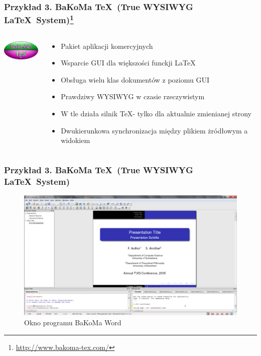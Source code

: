 \documentclass[t]{beamer}
\begin{document}
\begin{frame}[t]
	\frametitle{Przykład 3. BaKoMa \TeX\ (True WYSIWYG \LaTeX\ System)\footnote{\url{http://www.bakoma-tex.com/}}}
		\begin{columns}[T]
			\begin{column}{.15\textwidth}
				\includegraphics[width=2cm]{bakoma_logo.png}
			\end{column}
			\begin{column}{.85\textwidth}
				\begin{itemize}
					\item Pakiet aplikacji komercyjnych 
					\item Wsparcie GUI dla większości funckji \LaTeX\ 
					\item Obsługa wielu klas dokumentów z poziomu GUI
					\item Prawdziwy WYSIWYG w czasie rzeczywistym
					\item W tle działa silnik \TeX - tylko dla aktualnie zmienianej strony
					\item Dwukierunkowa synchronizacja między plikiem żródłowym a widokiem
				\end{itemize}
			\end{column}		
		\end{columns}
\end{frame}

\begin{frame}[t]
	\frametitle{Przykład 3. BaKoMa \TeX\ (True WYSIWYG \LaTeX\ System)}
		\begin{figure}[p]
     	    \centering
			\includegraphics[width=.95\textwidth]{bakoma_prtscn.png}
     	    \caption{Okno programu BaKoMa Word}
		\end{figure}
		
\end{frame}
\end{document}
